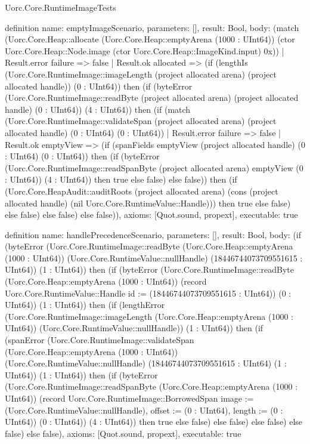 \begin{lexlean}{Uorc.Core.RuntimeImageTests}
\begin{semanticmodule}
definition{
  name: emptyImageScenario,
  parameters: [],
  result: Bool,
  body: (match (Uorc.Core.Heap::allocate (Uorc.Core.Heap::emptyArena (1000 : UInt64)) (ctor Uorc.Core.Heap::Node.image (ctor Uorc.Core.Heap::ImageKind.input) 0x))
    | Result.error failure => false
    | Result.ok allocated => (if (lengthIs (Uorc.Core.RuntimeImage::imageLength (project allocated arena) (project allocated handle)) (0 : UInt64)) then (if (byteError (Uorc.Core.RuntimeImage::readByte (project allocated arena) (project allocated handle) (0 : UInt64)) (4 : UInt64)) then (if (match (Uorc.Core.RuntimeImage::validateSpan (project allocated arena) (project allocated handle) (0 : UInt64) (0 : UInt64))
      | Result.error failure => false
      | Result.ok emptyView => (if (spanFields emptyView (project allocated handle) (0 : UInt64) (0 : UInt64)) then (if (byteError (Uorc.Core.RuntimeImage::readSpanByte (project allocated arena) emptyView (0 : UInt64)) (4 : UInt64)) then true else false) else false)) then (if (Uorc.Core.HeapAudit::auditRoots (project allocated arena) (cons (project allocated handle) (nil Uorc.Core.RuntimeValue::Handle))) then true else false) else false) else false) else false)),
  axioms: [Quot.sound, propext],
  executable: true
}

definition{
  name: handlePrecedenceScenario,
  parameters: [],
  result: Bool,
  body: (if (byteError (Uorc.Core.RuntimeImage::readByte (Uorc.Core.Heap::emptyArena (1000 : UInt64)) (Uorc.Core.RuntimeValue::nullHandle) (18446744073709551615 : UInt64)) (1 : UInt64)) then (if (byteError (Uorc.Core.RuntimeImage::readByte (Uorc.Core.Heap::emptyArena (1000 : UInt64)) (record Uorc.Core.RuntimeValue::Handle {id := (18446744073709551615 : UInt64)}) (0 : UInt64)) (1 : UInt64)) then (if (lengthError (Uorc.Core.RuntimeImage::imageLength (Uorc.Core.Heap::emptyArena (1000 : UInt64)) (Uorc.Core.RuntimeValue::nullHandle)) (1 : UInt64)) then (if (spanError (Uorc.Core.RuntimeImage::validateSpan (Uorc.Core.Heap::emptyArena (1000 : UInt64)) (Uorc.Core.RuntimeValue::nullHandle) (18446744073709551615 : UInt64) (1 : UInt64)) (1 : UInt64)) then (if (byteError (Uorc.Core.RuntimeImage::readSpanByte (Uorc.Core.Heap::emptyArena (1000 : UInt64)) (record Uorc.Core.RuntimeImage::BorrowedSpan {image := (Uorc.Core.RuntimeValue::nullHandle), offset := (0 : UInt64), length := (0 : UInt64)}) (0 : UInt64)) (4 : UInt64)) then true else false) else false) else false) else false) else false),
  axioms: [Quot.sound, propext],
  executable: true
}


\end{semanticmodule}
\end{lexlean}
